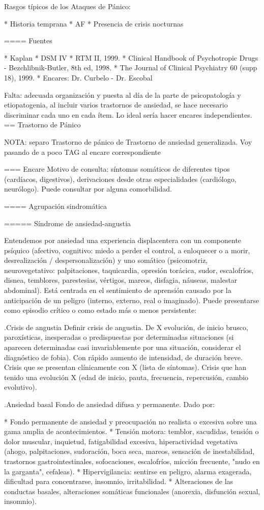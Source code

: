 \documentclass{scrbook}
\begin{document}
Rasgos típicos de los Ataques de Pánico:

* Historia temprana
* AF
* Presencia de crisis nocturnas

==== Fuentes

* Kaplan
* DSM IV
* RTM II, 1999.
* Clinical Handbook of Psychotropic Drugs - Bezchlibnik-Butler, 8th ed, 1998.
* The Journal of Clinical Psychiatry 60 (supp 18), 1999.
* Encares: Dr. Curbelo - Dr. Escobal

Falta: adecuada organización y puesta al día de la parte de psicopatología y etiopatogenia, al incluir varios trastornos de ansiedad, se hace necesario discriminar cada uno en cada ítem. Lo ideal sería hacer encares independientes.
== Trastorno de Pánico

NOTA: separo Trastorno de pánico de Trastorno de ansiedad generalizada. Voy pasando de a poco TAG al encare correspondiente

=== Encare
Motivo de consulta: síntomas somáticos de diferentes tipos (cardíacos, digestivos), derivaciones desde otras especialidades (cardiólogo, neurólogo). Puede consultar por alguna comorbilidad.

==== Agrupación sindromática

===== Síndrome de ansiedad-angustia

Entendemos por ansiedad una experiencia displacentera con un componente psíquico (afectivo, cognitivo: miedo a perder el control, a enloquecer o a morir, desrealización / despersonalización) y uno somático (psicomotriz, neurovegetativo: palpitaciones, taquicardia, opresión torácica, sudor, escalofríos, disnea, temblores, parestesias, vértigos, mareos, disfagia, náuseas, malestar abdominal). Está centrada en el sentimiento de aprensión causado por la anticipación de un peligro (interno, externo, real o imaginado). Puede presentarse como episodio crítico o como estado más o menos persistente:

.Crisis de angustia
Definir crisis de angustia. De X evolución, de inicio brusco, paroxísticas, inesperadas o predispuestas por determinadas situaciones (si aparecen determinadas casi invariablemente por una situación, considerar el diagnóstico de fobia). Con rápido aumento de intensidad, de duración breve.  Crisis que se presentan clínicamente con X (lista de síntomas). Crisis que han tenido una evolución X (edad de inicio, pauta, frecuencia, repercusión, cambio evolutivo).

.Ansiedad basal
Fondo de ansiedad difusa y permanente. Dado por:

* Fondo permanente de ansiedad y preocupación no realista o excesiva sobre una gama amplia de acontecimientos.
* Tensión motora: temblor, sacudidas, tensión o dolor muscular, inquietud, fatigabilidad excesiva, hiperactividad vegetativa (ahogo, palpitaciones, sudoración, boca seca, mareos, sensación de inestabilidad, trastornos gastrointestinales, sofocaciones, escalofríos, micción frecuente, "nudo en la garganta", cefaleas).
* Hipervigilancia: sentirse en peligro, alarma exagerada, dificultad para concentrarse, insomnio, irritabilidad.
* Alteraciones de las conductas basales, alteraciones somáticas funcionales (anorexia, disfunción sexual, insomnio).
\end{document}
